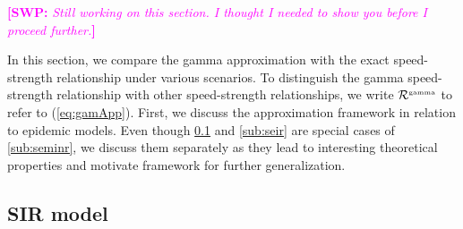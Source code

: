 \documentclass[12pt]{article}
\newcommand{\RR}{\ensuremath{{\cal R}}}
\newcommand{\eref}[1]{(\ref{eq:#1})}
\newcommand{\tsup}[2]{#1^{{\textrm{\tiny #2}}}}
\newcommand{\comment}[3]{\textcolor{#1}{\textbf{[#2: }\textit{#3}\textbf{]}}}
\newcommand{\swp}[1]{\comment{magenta}{SWP}{#1}}
\begin{document}
\swp{Still working on this section. I thought I needed to show you before I proceed further.}
 
In this section, we compare the gamma approximation with the exact speed-strength relationship under various scenarios.
To distinguish the gamma speed-strength relationship with other speed-strength relationships, we write $\tsup{\RR}{gamma}$ to refer to \eref{gamApp}.
First, we discuss the approximation framework in relation to epidemic models.
Even though \ref{sub:sir} and  \ref{sub:seir} are special cases of \ref{sub:seminr}, 
we discuss them separately as they lead to interesting theoretical properties and motivate framework for further generalization.

\subsection{SIR model}
\label{sub:sir}
\end{document}
